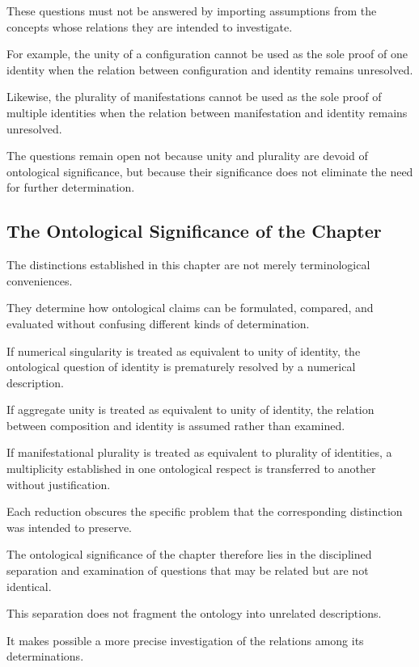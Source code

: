 These questions must not be
answered by importing assumptions
from the concepts whose relations
they are intended to investigate.

For example, the unity of
a configuration cannot be
used as the sole proof of
one identity when the relation
between configuration and
identity remains unresolved.

Likewise, the plurality of
manifestations cannot be used
as the sole proof of multiple
identities when the relation
between manifestation and
identity remains unresolved.

The questions remain open
not because unity and plurality
are devoid of ontological
significance, but because
their significance does
not eliminate the need
for further determination.

\subsection{The Ontological Significance of the Chapter}

The distinctions established
in this chapter are not merely
terminological conveniences.

They determine how ontological
claims can be formulated,
compared, and evaluated without
confusing different kinds
of determination.

If numerical singularity
is treated as equivalent
to unity of identity, the
ontological question of identity
is prematurely resolved
by a numerical description.

If aggregate unity is treated
as equivalent to unity of
identity, the relation between
composition and identity
is assumed rather than examined.

If manifestational plurality
is treated as equivalent
to plurality of identities,
a multiplicity established
in one ontological respect
is transferred to another
without justification.

Each reduction obscures
the specific problem that
the corresponding distinction
was intended to preserve.

The ontological significance
of the chapter therefore
lies in the disciplined
separation and examination
of questions that may be
related but are not identical.

This separation does not
fragment the ontology into
unrelated descriptions.

It makes possible a more
precise investigation of
the relations among its
determinations.


